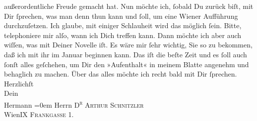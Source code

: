 \begin{ledgroupsized}[t]{13cm}
               außerordentliche Freude gemacht hat. Nun möchte ich, ſobald Du zurück biſt, mit Dir
               ſprechen, was man denn thun kann und ſoll, um eine Wiener Aufführung durchzuſetzen. Ich glaube, mit einiger Schlauheit wird das
               möglich ſein. Bitte, telephoniere mir alſo, wann ich Dich {\pb}treffen kann.\pend
           \pstart
           Dann möchte ich aber auch wiſſen, was mit Deiner Novelle iſt. Es wäre mir ſehr wichtig, Sie so zu bekommen,
               daß ich mit ihr im Januar beginnen kann. Das iſt die beſte Zeit und es ſoll auch
               ſonſt alles geſchehen, um Dir den »Aufenthalt« in meinem Blatte angenehm und behaglich zu machen.\pend
           \pstart
           Über das alles möchte ich recht bald mit Dir ſprechen.\pend
           \pstart
           Herzlichſt{\\[\baselineskip]}Dein{\\[\baselineskip]}\spacefill\mbox{Hermann}\pend
           \leftskip=0em{}\pstart
           \noindent{}Herrn \textsc{D\textsuperscript{r} Arthur Schnitzler}{\\}WienIX \textsc{Frankgasse} 1.\pend
           \pstart
           \textcolor{gray}{\textbf{\label{T_L00617_1v}\label{T_L00617_1h}}}\pend
           \endnumbering{}\end{ledgroupsized}  \newcommand{\dateiname}{L00617}\newcommand{\titel}{Hermann Bahr an Arthur Schnitzler, 5. 11. 1896}\newcommand{\editorInnen}{ Kurt Ifkovits,  Martin Anton Müller}
      